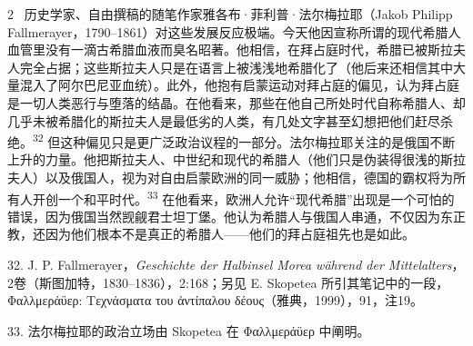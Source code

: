 \documentclass[10pt,a4paper]{article}
\begin{document}
\begin{paracol}{2}
\switchcolumn*
{\scriptsize\color{gray}[p. 359–360]}\ 历史学家、自由撰稿的随笔作家雅各布·菲利普·法尔梅拉耶（Jakob Philipp Fallmerayer，1790–1861）对这些发展反应极端。今天他因宣称所谓的现代希腊人血管里没有一滴古希腊血液而臭名昭著。他相信，在拜占庭时代，希腊已被斯拉夫人完全占据；这些斯拉夫人只是在语言上被浅浅地希腊化了（他后来还相信其中大量混入了阿尔巴尼亚血统）。此外，他抱有启蒙运动对拜占庭的偏见，认为拜占庭是一切人类恶行与堕落的结晶。在他看来，那些在他自己所处时代自称希腊人、却几乎未被希腊化的斯拉夫人是最低劣的人类，有几处文字甚至幻想把他们赶尽杀绝。\nobreak\textsuperscript{32} 但这种偏见只是更广泛政治议程的一部分。法尔梅拉耶关注的是俄国不断上升的力量。他把斯拉夫人、中世纪和现代的希腊人（他们只是伪装得很浅的斯拉夫人）以及俄国人，视为对自由启蒙欧洲的同一威胁；他相信，德国的霸权将为所有人开创一个和平时代。\nobreak\textsuperscript{33} 在他看来，欧洲人允许“现代希腊”出现是一个可怕的错误，因为俄国当然觊觎君士坦丁堡。他认为希腊人与俄国人串通，不仅因为东正教，还因为他们根本不是真正的希腊人——他们的拜占庭祖先也是如此。\par{\small 32. J. P. Fallmerayer，\textit{Geschichte der Halbinsel Morea während der Mittelalters}，2卷（斯图加特，1830–1836），2:168；另见 E. Skopetea 所引其笔记中的一段，Φαλλμεράϋερ: Τεχνάσματα του ἀντίπαλου δέους（雅典，1999），91，注19。\par}{\small 33. 法尔梅拉耶的政治立场由 Skopetea 在 Φαλλμεράϋερ 中阐明。\par}
\switchcolumn

\end{paracol}
\end{document}
